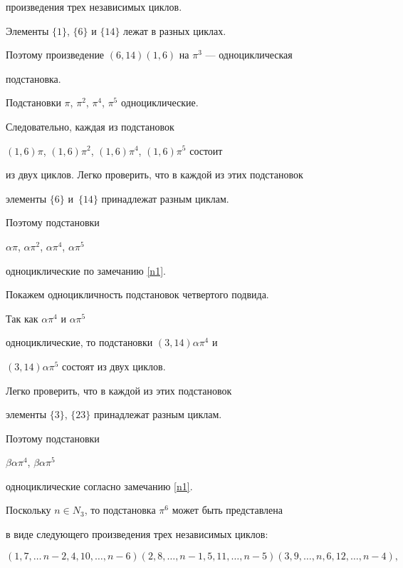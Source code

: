 \begin{pf}
произведения трех независимых циклов.


Элементы $\{1\}$, $\{6\} $ и $\{14\}$ лежат в разных циклах.


Поэтому произведение $(6,14)(1,6)$ на $ \pi^3$ --- одноциклическая


подстановка.





Подстановки $\pi$, $\pi^2$, $\pi^4$, $\pi^5$ одноциклические.


Следовательно, каждая из подстановок


$(1,6)\pi$, $(1,6)\pi^2$, $(1,6)\pi^4$, $(1,6)\pi^5 $ состоит


из двух циклов. Легко проверить, что в каждой из этих подстановок


элементы $\{6\}$ и\ $\{14\}$ принадлежат разным циклам.


Поэтому подстановки


$\alpha \pi$, $\alpha \pi^2$, $\alpha \pi^4$, $\alpha \pi^5$


одноциклические по замечанию \ref{n1}.





Покажем одноцикличность подстановок четвертого подвида.


Так как $\alpha \pi^4$ и $\alpha \pi^5$


одноциклические, то подстановки $(3,14) \alpha \pi^4$ и


$(3,14) \alpha \pi^5$ состоят из двух циклов.


Легко проверить, что в каждой из этих подстановок


элементы $\{3\}$, $\{23\}$ принадлежат разным циклам.


Поэтому подстановки


$\beta \alpha \pi^4$, $\beta \alpha \pi^5$


одноциклические согласно замечанию \ref{n1}.





Поскольку $n\in N_3$, то подстановка $\pi^6$ может быть представлена


в виде следующего произведения трех независимых циклов:


$$


(1,7,\dotsc\,n-2,4,10,\dotsc,n-6)(2,8,\dotsc,n-1,5,11,\dotsc,n-5)


(3,9,\dotsc,n,6,12,\dotsc,n-4),


$$



\end{pf}

